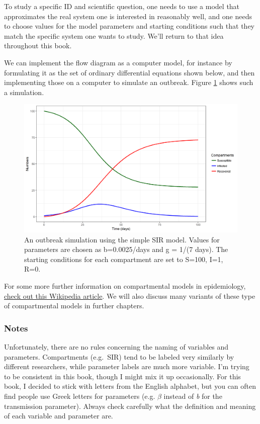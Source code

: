 \documentclass[]{book}
\theoremstyle{definition}
\theoremstyle{definition}
\theoremstyle{definition}
\theoremstyle{remark}
\begin{document}
To study a specific ID and scientific question, one needs to use a model
that approximates the real system one is interested in reasonably well,
and one needs to choose values for the model parameters and starting
conditions such that they match the specific system one wants to study.
We'll return to that idea throughout this book.

We can implement the flow diagram as a computer model, for instance by
formulating it as the set of ordinary differential equations shown
below, and then implementing those on a computer to simulate an
outbreak. Figure \ref{fig:sirsim} shows such a simulation.

\begin{figure}
\centering
\includegraphics{./images/sirsim.png}
\caption{\label{fig:sirsim}An outbreak simulation using the simple SIR
model. Values for parameters are chosen as b=0.0025/days and g = 1/(7
days). The starting conditions for each compartment are set to S=100,
I=1, R=0.}
\end{figure}

For some more further information on compartmental models in
epidemiology,
\href{https://en.wikipedia.org/wiki/Compartmental_models_in_epidemiology}{check
out this Wikipedia article}. We will also discuss many variants of these
type of compartmental models in further chapters.

\subsubsection{Notes}\label{mynotebox}

Unfortunately, there are no rules concerning the naming of variables and
parameters. Compartments (e.g.~SIR) tend to be labeled very similarly by
different researchers, while parameter labels are much more variable.
I'm trying to be consistent in this book, though I might mix it up
occasionally. For this book, I decided to stick with letters from the
English alphabet, but you can often find people use Greek letters for
parameters (e.g. \(\beta\) instead of \emph{b} for the transmission
parameter). Always check carefully what the definition and meaning of
each variable and parameter are.
\end{document}
